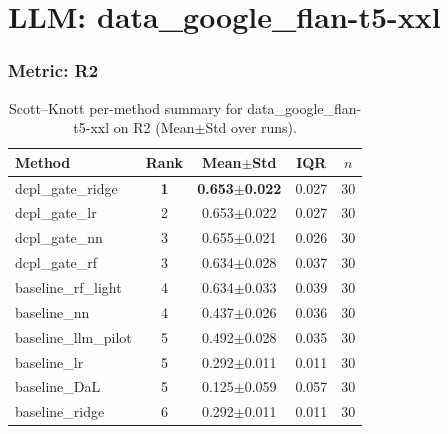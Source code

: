 \section*{LLM: data\_google\_flan-t5-xxl}

\subsubsection*{Metric: R2}
\begin{table}[H]
\centering
\scriptsize
\setlength{\tabcolsep}{4pt}
\renewcommand{\arraystretch}{1.1}
\caption{Scott--Knott per-method summary for data\_google\_flan-t5-xxl on R2 (Mean$\pm$Std over runs).}
\label{tab:sk_data_google_flan-t5-xxl_R2}
\begin{tabular}{l|c|c|c|c}
\hline
\textbf{Method} & \textbf{Rank} & \textbf{Mean$\pm$Std} & \textbf{IQR} & \textbf{$n$} \\
\hline
\rowcolor{red!15} dcpl\_gate\_ridge & \textbf{1} & \textbf{0.653$\pm$0.022} & 0.027 & 30 \\
dcpl\_gate\_lr & 2 & 0.653$\pm$0.022 & 0.027 & 30 \\
dcpl\_gate\_nn & 3 & 0.655$\pm$0.021 & 0.026 & 30 \\
dcpl\_gate\_rf & 3 & 0.634$\pm$0.028 & 0.037 & 30 \\
baseline\_rf\_light & 4 & 0.634$\pm$0.033 & 0.039 & 30 \\
baseline\_nn & 4 & 0.437$\pm$0.026 & 0.036 & 30 \\
baseline\_llm\_pilot & 5 & 0.492$\pm$0.028 & 0.035 & 30 \\
baseline\_lr & 5 & 0.292$\pm$0.011 & 0.011 & 30 \\
baseline\_DaL & 5 & 0.125$\pm$0.059 & 0.057 & 30 \\
baseline\_ridge & 6 & 0.292$\pm$0.011 & 0.011 & 30 \\
\hline
\end{tabular}
\end{table}

